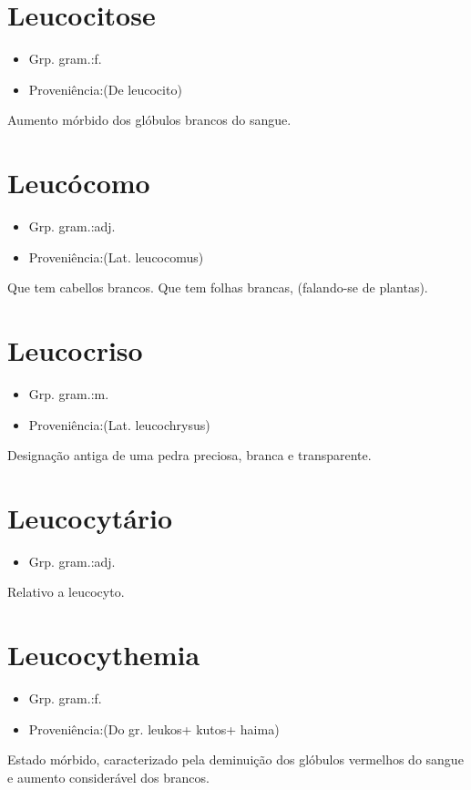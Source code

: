 \section{Leucocitose}
\begin{itemize}
\item {Grp. gram.:f.}
\end{itemize}
\begin{itemize}
\item {Proveniência:(De \textunderscore leucocito\textunderscore )}
\end{itemize}
Aumento mórbido dos glóbulos brancos do sangue.
\section{Leucócomo}
\begin{itemize}
\item {Grp. gram.:adj.}
\end{itemize}
\begin{itemize}
\item {Proveniência:(Lat. \textunderscore leucocomus\textunderscore )}
\end{itemize}
Que tem cabellos brancos.
Que tem folhas brancas, (falando-se de plantas).
\section{Leucocriso}
\begin{itemize}
\item {Grp. gram.:m.}
\end{itemize}
\begin{itemize}
\item {Proveniência:(Lat. \textunderscore leucochrysus\textunderscore )}
\end{itemize}
Designação antiga de uma pedra preciosa, branca e transparente.
\section{Leucocytário}
\begin{itemize}
\item {Grp. gram.:adj.}
\end{itemize}
Relativo a leucocyto.
\section{Leucocythemia}
\begin{itemize}
\item {Grp. gram.:f.}
\end{itemize}
\begin{itemize}
\item {Proveniência:(Do gr. \textunderscore leukos\textunderscore  + \textunderscore kutos\textunderscore  + \textunderscore haima\textunderscore )}
\end{itemize}
Estado mórbido, caracterizado pela deminuição dos glóbulos vermelhos do sangue e aumento considerável dos brancos.
